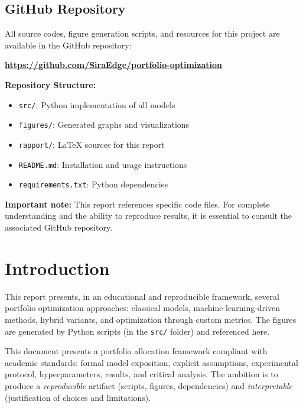 \documentclass[11pt,a4paper]{article}
\begin{document}
\subsection*{GitHub Repository}
All source codes, figure generation scripts, and resources for this project are available in the GitHub repository:
\begin{center}
\textbf{\url{https://github.com/SiraEdge/portfolio-optimization}}
\end{center}

\textbf{Repository Structure:}
\begin{itemize}
    \item \texttt{src/}: Python implementation of all models
    \item \texttt{figures/}: Generated graphs and visualizations
    \item \texttt{rapport/}: LaTeX sources for this report
    \item \texttt{README.md}: Installation and usage instructions
    \item \texttt{requirements.txt}: Python dependencies
\end{itemize}

\textbf{Important note:} This report references specific code files. For complete understanding and the ability to reproduce results, it is essential to consult the associated GitHub repository.

\newpage

\tableofcontents

\newpage

\section{Introduction}
This report presents, in an educational and reproducible framework, several portfolio optimization approaches: classical models, machine learning-driven methods, hybrid variants, and optimization through custom metrics. The figures are generated by Python scripts (in the \texttt{src/} folder) and referenced here.

\begin{tcolorbox}[title=Research context and objectives]
This document presents a portfolio allocation framework compliant with academic standards: formal model exposition, explicit assumptions, experimental protocol, hyperparameters, results, and critical analysis. The ambition is to produce a \emph{reproducible} artifact (scripts, figures, dependencies) and \emph{interpretable} (justification of choices and limitations).
\end{tcolorbox}
\end{document}

